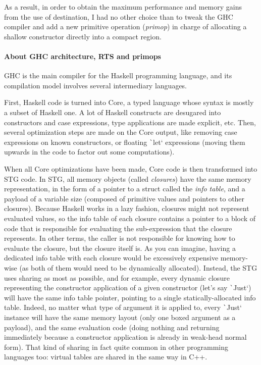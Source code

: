 \documentclass[english]{jflart}
\begin{document}
As a result, in order to obtain the maximum performance and memory gains from the use of destination, I had no other choice than to tweak the GHC compiler and add a new primitive operation (\emph{primop}) in charge of allocating a shallow constructor directly into a compact region.

\paragraph{About GHC architecture, RTS and primops}

GHC is the main compiler for the Haskell programming language, and its compilation model involves several intermediary languages.

First, Haskell code is turned into Core, a typed language whose syntax is mostly a subset of Haskell one. A lot of Haskell constructs are desugared into constructors and case expressions, type applications are made explicit, etc.
Then, several optimization steps are made on the Core output, like removing case expressions on known constructors, or floating \texttt`let` expressions (moving them upwards in the code to factor out some computations).

When all Core optimizations have been made, Core code is then transformed into STG code. In STG, all memory objects (called \emph{closures}) have the same memory representation, in the form of a pointer to a struct called the \emph{info table}, and a payload of a variable size (composed of primitive values and pointers to other closures). Because Haskell works in a lazy fashion, closures might not represent evaluated values, so the info table of each closure contains a pointer to a block of code that is responsible for evaluating the sub-expression that the closure represents. In other terms, the caller is not responsible for knowing how to evaluate the closure, but the closure itself is.
As you can imagine, having a dedicated info table with each closure would be excessively expensive memory-wise (as both of them would need to be dynamically allocated). Instead, the STG uses sharing as most as possible, and for example, every dynamic closure representing the constructor application of a given constructor (let's say \texttt`Just`) will have the same info table pointer, pointing to a single statically-allocated info table. Indeed, no matter what type of argument it is applied to, every \texttt`Just` instance will have the same memory layout (only one boxed argument as a payload), and the same evaluation code (doing nothing and returning immediately because a constructor application is already in weak-head normal form). That kind of sharing in fact quite common in other programming languages too: virtual tables are shared in the same way in C++.
\end{document}
